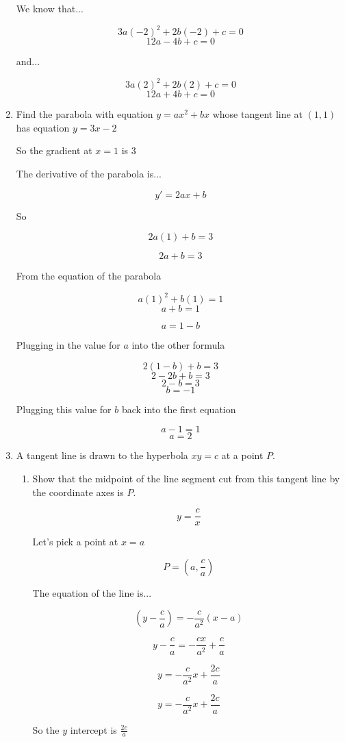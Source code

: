 \documentclass{article}
\begin{document}
\begin{enumerate}
				We know that...

				$$3a(-2)^2 + 2b(-2) + c = 0$$
				$$12a -4b + c = 0$$

				and...

				$$3a(2)^2 + 2b(2) + c = 0$$
				$$12a + 4b + c = 0$$

			\item Find the parabola with equation $y = ax^2 + bx$ whose tangent line at $(1,1)$
				has equation $y = 3x - 2$

				So the gradient at $x = 1$ is 3

				The derivative of the parabola is...

				$$y' = 2ax + b$$

				So
	
				$$2a(1) + b = 3$$

				$$2a + b = 3$$

				From the equation of the parabola

				$$a(1)^2 + b(1) = 1$$
				$$a + b = 1$$

				$$a = 1 - b$$

				Plugging in the value for $a$ into the other formula

				$$2(1-b) + b = 3$$
				$$2-2b+b=3$$
				$$2-b = 3$$
				$$b=-1$$

				Plugging this value for $b$ back into the first equation

				$$a-1 = 1$$
				$$a = 2$$

 			\item A tangent line is drawn to the hyperbola $xy = c$ at a point $P$.
			\begin{enumerate}
				\item Show that the midpoint of the line segment cut from this
					tangent line by the coordinate axes is $P$.

					$$y = \frac{c}{x}$$

					Let's pick a point at $x = a$

					$$P = (a, \frac{c}{a})$$

					The equation of the line is...

					$$(y - \frac{c}{a}) = - \frac{c}{a^2}(x - a)$$

					$$y - \frac{c}{a} = - \frac{cx}{a^2} + \frac{c}{a}$$

					$$y = - \frac{c}{a^2}x + \frac{2c}{a}$$

					$$y = - \frac{c}{a^2}x + \frac{2c}{a}$$

					So the $y$ intercept is $\frac{2c}{a}$


\end{enumerate}
\end{enumerate}
\end{document}
